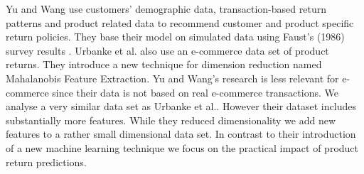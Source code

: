 \documentclass[12pt]{article}
\begin{document}
Yu and Wang use customers’ demographic data, transaction-based return patterns and product related data to recommend customer and product specific return policies. They base their model on simulated data using Faust’s (1986) survey results \cite{yu2008hybrid}. Urbanke et al. also use an e-commerce data set of product returns. They introduce a new technique for dimension reduction named Mahalanobis Feature Extraction. Yu and Wang’s research is less relevant for e-commerce since their data is not based on real e-commerce transactions. We analyse a very similar data set as Urbanke et al.. However their dataset includes substantially more features. While they reduced dimensionality we add new features to a rather small dimensional data set. In contrast to their introduction of a new machine learning technique we focus on the practical impact of product return predictions.
\end{document}
